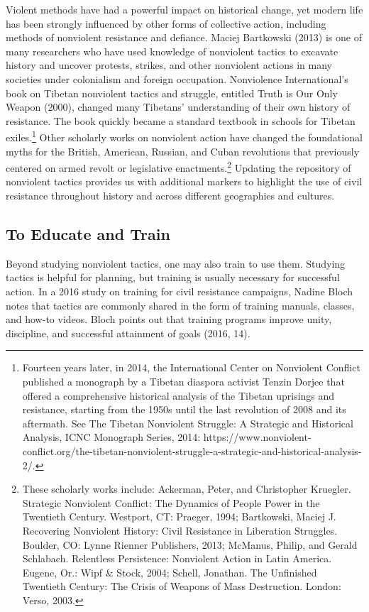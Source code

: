 \documentclass[twoside,a4paper,12pt,fleqn,openany]{extbook}
\begin{document}
Violent methods have had a powerful impact on historical change, yet modern life has been strongly influenced by other forms of collective action, including methods of nonviolent resistance and defiance. Maciej Bartkowski (2013) is one of many researchers who have used knowledge of nonviolent tactics to excavate history and uncover protests, strikes, and other nonviolent actions in many societies under colonialism and foreign occupation.
Nonviolence International’s book on Tibetan nonviolent tactics and struggle, entitled Truth
is Our Only Weapon (2000), changed many Tibetans’ understanding of their own history of
resistance. The book quickly became a standard textbook in schools for Tibetan exiles.\footnote{Fourteen years later, in 2014, the International Center on Nonviolent Conflict published a monograph by a Tibetan diaspora activist Tenzin Dorjee that offered a comprehensive historical analysis of the Tibetan uprisings and resistance, starting from the 1950s until the last revolution of 2008 and its aftermath. See The Tibetan Nonviolent Struggle: A Strategic and Historical Analysis, ICNC Monograph Series, 2014: https://www.nonviolent-conflict.org/the-tibetan-nonviolent-struggle-a-strategic-and-historical-analysis-2/.}
Other scholarly works on nonviolent action have changed the foundational myths for the British, American, Russian, and Cuban revolutions that previously centered on armed revolt or legislative enactments.\footnote{These scholarly works include: Ackerman, Peter, and Christopher Kruegler. Strategic Nonviolent Conflict: The Dynamics of People Power in the Twentieth Century. Westport, CT: Praeger, 1994; Bartkowski, Maciej J. Recovering Nonviolent History: Civil Resistance in Liberation Struggles. Boulder, CO: Lynne Rienner Publishers, 2013; McManus, Philip, and Gerald Schlabach. Relentless Persistence: Nonviolent Action in Latin America. Eugene, Or.: Wipf & Stock, 2004; Schell, Jonathan. The Unfinished Twentieth Century: The Crisis of Weapons of Mass Destruction. London: Verso, 2003.} Updating the repository of nonviolent tactics provides us with additional markers to highlight the use of civil resistance throughout history and across different geographies and cultures.

\subsection*{To Educate and Train}

Beyond studying nonviolent tactics, one may also train to use them. Studying tactics is helpful for planning, but training is usually necessary for successful action. In a 2016 study on training for civil resistance campaigns, Nadine Bloch notes that tactics are commonly shared in the form of training manuals, classes, and how-to videos. Bloch points out that training programs improve unity, discipline, and successful attainment of goals (2016, 14).
\end{document}
